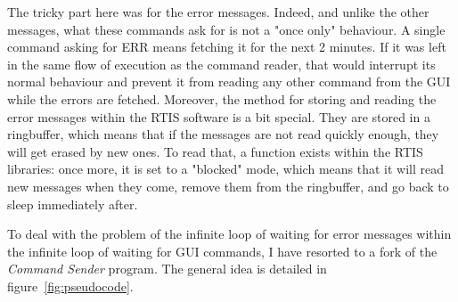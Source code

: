 \documentclass{themeensg}
\begin{document}
The tricky part here was for the error messages. Indeed, and unlike the other messages, what these commands ask for is not a "once only" behaviour. A single command asking for ERR means fetching it for the next 2 minutes. If it was left in the same flow of execution as the command reader, that would interrupt its normal behaviour and prevent it from reading any other command from the GUI while the errors are fetched.
Moreover, the method for storing and reading the error messages within the RTIS software is a bit special. They are stored in a ringbuffer, which means that if the messages are not read quickly enough, they will get erased by new ones. To read that, a function exists within the RTIS libraries: once more, it is set to a "blocked" mode, which means that it will read new messages when they come, remove them from the ringbuffer, and go back to sleep immediately after.

To deal with the problem of the infinite loop of waiting for error messages within the infinite loop of waiting for GUI commands, I have resorted to a fork of the \textit{Command Sender} program. The general idea is detailed in figure~\ref{fig:pseudocode}.\\
\end{document}

